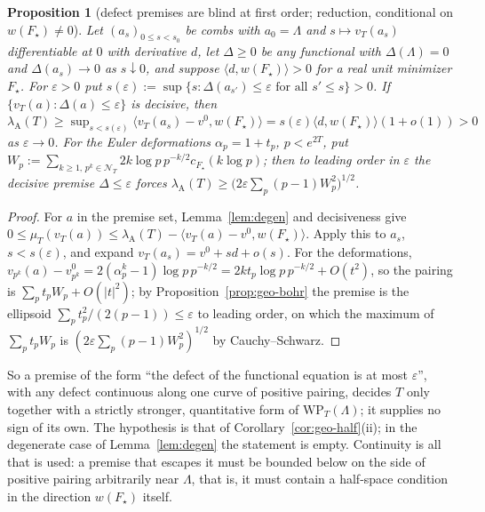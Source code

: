\documentclass[11pt]{amsart}
\newtheorem{proposition}[theorem]{Proposition}
\theoremstyle{definition}
\theoremstyle{remark}
\newcommand{\lamA}{\lambda_{\mathrm A}(T)}
\newcommand{\NT}{\mathcal N_T}
\begin{document}
\begin{proposition}[defect premises are blind at first order; reduction, conditional on $w(F_\star)\ne0$]\label{prop:geo-blind}
Let $(a_s)_{0\le s<s_0}$ be combs with $a_0=\Lambda$ and $s\mapsto v_T(a_s)$ differentiable at $0$ with derivative $d$, let $\Delta\ge0$ be any
functional with $\Delta(\Lambda)=0$ and $\Delta(a_s)\to0$ as $s\downarrow0$, and suppose $\langle d,w(F_\star)\rangle>0$ for a real unit
minimizer $F_\star$. For $\varepsilon>0$ put $s(\varepsilon):=\sup\{s:\Delta(a_{s'})\le\varepsilon\text{ for all }s'\le s\}>0$. If
$\{v_T(a):\Delta(a)\le\varepsilon\}$ is decisive, then $\lamA\ge\sup_{s<s(\varepsilon)}\langle v_T(a_s)-v^0,w(F_\star)\rangle
=s(\varepsilon)\langle d,w(F_\star)\rangle(1+o(1))>0$ as $\varepsilon\to0$.
For the Euler deformations $\alpha_p=1+t_p$, $p<e^{2T}$, put $W_p:=\sum_{k\ge1,\,p^k\in\NT}2k\log p\,p^{-k/2}c_{F_\star}(k\log p)$; then to
leading order in $\varepsilon$ the decisive premise $\Delta\le\varepsilon$ forces $\lamA\ge\big(2\varepsilon\sum_p(p-1)W_p^2\big)^{1/2}$.
\end{proposition}
\begin{proof}
For $a$ in the premise set, Lemma~\ref{lem:degen} and decisiveness give $0\le\mu_T(v_T(a))\le\lamA-\langle v_T(a)-v^0,w(F_\star)\rangle$.
Apply this to $a_s$, $s<s(\varepsilon)$, and expand $v_T(a_s)=v^0+sd+o(s)$. For the deformations,
$v_{p^k}(a)-v^0_{p^k}=2(\alpha_p^k-1)\log p\,p^{-k/2}=2kt_p\log p\,p^{-k/2}+O(t^2)$, so the pairing is $\sum_pt_pW_p+O(|t|^2)$; by
Proposition~\ref{prop:geo-bohr} the premise is the ellipsoid $\sum_pt_p^2/(2(p-1))\le\varepsilon$ to leading order, on which the maximum of
$\sum_pt_pW_p$ is $(2\varepsilon\sum_p(p-1)W_p^2)^{1/2}$ by Cauchy--Schwarz.
\end{proof}

So a premise of the form ``the defect of the functional equation is at most $\varepsilon$'', with any defect continuous along one curve
of positive pairing, decides $T$ only together with a strictly stronger, quantitative form of $\mathrm{WP}_T(\Lambda)$; it supplies no
sign of its own. The hypothesis is that of Corollary~\ref{cor:geo-half}(ii); in the degenerate case of Lemma~\ref{lem:degen} the
statement is empty. Continuity is all that is used: a premise that escapes it must be bounded below on the side of positive pairing
arbitrarily near $\Lambda$, that is, it must contain a half-space condition in the direction $w(F_\star)$ itself.
\end{document}
